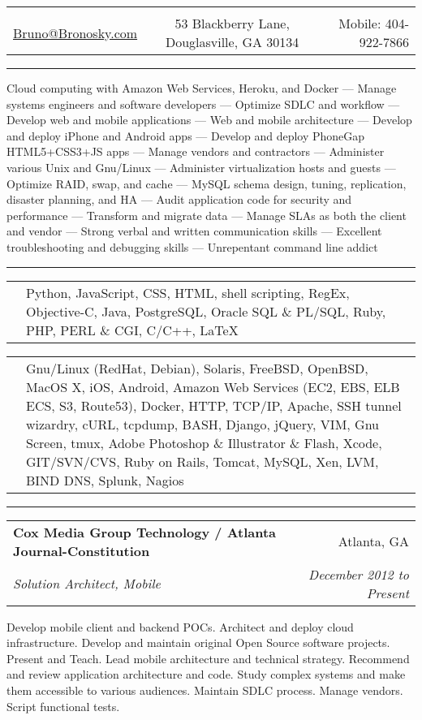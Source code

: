 \documentclass[10pt]{article}
\makeatletter
\newcommand{\heading}[4]{
    \begin{center}
    \begin{tabular*}{\textwidth}{@{\extracolsep{\fill}}lcr}
    &\huge{\textbf{\sc{#1}}}&\\
    \href{mailto:#2}{\small #2} & \small #3 & \small Mobile: #4\\
    \hline\hline
    \end{tabular*}
    \end{center}
}
\newcounter{blocktitlechildren}
\newcommand{\blocktitle}[1]{
    \blocktitlechild{4mm}
    \setcounter{blocktitlechildren}{0}
    {{\sc{#1}\vspace{1.5mm}\hrule}\vspace*{1.5mm}}
}
\newcommand{\blocktitlechild}[2][]{
    \ifthenelse{\equal{\value{blocktitlechildren}}{0}}{}{\vspace{#2}#1}
    \addtocounter{blocktitlechildren}{1}
}
\newcommand{\skillnew}[2]{
    \blocktitlechild{1mm}
    \begin{tabular}
        {p{2cm}p{17cm}}
        \noindent\raggedright{\skillfont{#1}} & #2
    \end{tabular}
}
\newcommand{\sectionheader}[4]{
    \blocktitlechild{2mm}
    \begin{tabular*}{\textwidth}{l@{\extracolsep{\fill}}r}
    \textbf{#1} & #2\\
    \emph{#3} & \emph{#4}
    \end{tabular*}
}
\newenvironment{longtext}[1]{\small {#1}}
\makeatother
\begin{document}
\heading{Richard Paul Bronosky}
{Bruno@Bronosky.com}
{53 Blackberry Lane, Douglasville, GA 30134}
{404-922-7866}

\blocktitle{Overview}
\blocktitlechild{2mm}
\begin{longtext}
    Cloud computing with Amazon Web Services, Heroku, and Docker ---
    Manage systems engineers and software developers ---
    Optimize SDLC and workflow ---
    Develop web and mobile applications ---
    Web and mobile architecture ---
    Develop and deploy iPhone and Android apps ---
    Develop and deploy PhoneGap HTML5+CSS3+JS apps ---
    Manage vendors and contractors ---
    Administer various Unix and Gnu/Linux ---
    Administer virtualization hosts and guests ---
    Optimize RAID, swap, and cache ---
    MySQL schema design, tuning, replication, disaster planning, and HA ---
    Audit application code for security and performance ---
    Transform and migrate data ---
    Manage SLAs as both the client and vendor ---
    Strong verbal and written communication skills ---
    Excellent troubleshooting and debugging skills ---
    Unrepentant command line addict
\end{longtext}

\blocktitle{Skills}
\skillnew{Languages}{
    Python,
    JavaScript,
    CSS,
    HTML,
    shell scripting,
    RegEx,
    Objective-C,
    Java,
    PostgreSQL,
    Oracle SQL \& PL/SQL,
    Ruby,
    PHP,
    PERL \& CGI,
    C/C++,
    \LaTeX
}

\skillnew{Systems \& Software}{
    Gnu/Linux (RedHat, Debian),
    Solaris,
    FreeBSD,
    OpenBSD,
    MacOS X,
    iOS,
    Android,
    Amazon Web Services (EC2, EBS, ELB ECS, S3, Route53),
    Docker,
    HTTP,
    TCP/IP,
    Apache,
    SSH tunnel wizardry,
    cURL,
    tcpdump,
    BASH,
    Django,
    jQuery,
    VIM,
    Gnu Screen,
    tmux,
    Adobe Photoshop \& Illustrator \& Flash,
    Xcode,
    GIT/SVN/CVS,
    Ruby on Rails,
    Tomcat,
    MySQL,
    Xen,
    LVM,
    BIND DNS,
    Splunk,
    Nagios
}

\blocktitle{Experience}
\sectionheader
{Cox Media Group Technology / Atlanta Journal-Constitution}
{Atlanta, GA}
{Solution Architect, Mobile}
{December 2012 to Present}
\begin{longtext}
Develop mobile client and backend POCs.
Architect and deploy cloud infrastructure.
Develop and maintain original Open Source software projects.
Present and Teach.
Lead mobile architecture and technical strategy.
Recommend and review application architecture and code.
Study complex systems and make them accessible to various audiences.
Maintain SDLC process.
Manage vendors.
Script functional tests.
\end{longtext}
\end{document}
